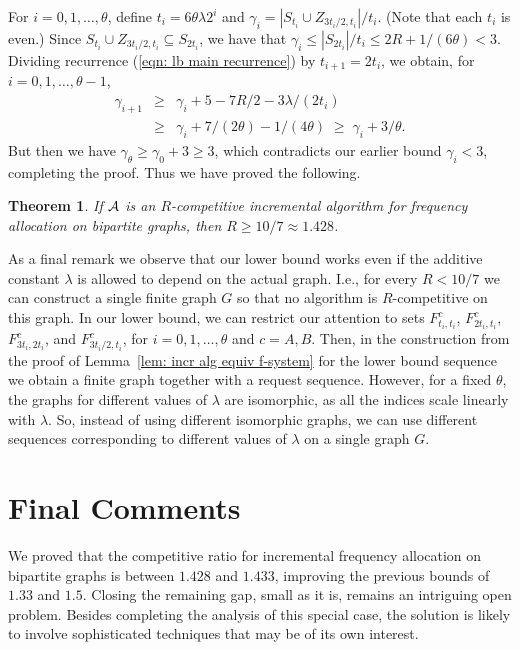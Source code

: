 \documentclass[11pt]{article}
\newcommand{\calA}{{\cal A}}
\newtheorem{theorem}{Theorem}[section]
\begin{document}
For $i = 0,1,\ldots,\theta$, define $t_i = 6\theta\lambda 2^i$ and
$\gamma_i = |S_{t_i} \cup Z_{3t_i/2,t_i}|/t_i$. (Note that each
$t_i$ is even.)
Since $S_{t_i} \cup Z_{3t_i/2,t_i} \subseteq S_{2t_i}$, we have
that $\gamma_i \le |S_{2t_i}|/t_i \le 2R +1/(6\theta) < 3$.
Dividing recurrence (\ref{eqn: lb main recurrence}) by $t_{i+1} = 2t_i$, 
we obtain, for $i = 0,1,\ldots,\theta-1$,
\begin{eqnarray*}
\gamma_{i+1} &\ge& \gamma_i + 5 - 7R/2 - 3\lambda/(2t_i) 
	\\
	&\ge& \gamma_i + 7/(2\theta) - 1/(4\theta)
	\;\ge\; \gamma_i + 3/\theta.
\end{eqnarray*}
But then we have $\gamma_\theta \ge \gamma_0 + 3 \ge 3$,
which contradicts our earlier bound $\gamma_i < 3$, completing
the proof. Thus we have proved the following.



\begin{theorem}\label{thm: 10/7 lower bound}
If $\calA$ is an $R$-competitive incremental algorithm for frequency
allocation on bipartite graphs, then $R\geq 10/7\approx 1.428$.
\end{theorem}

As a final remark we observe that our lower bound works even if the
additive constant $\lambda$ is allowed to depend on the actual
graph. I.e., for every $R<10/7$ we can construct a single finite graph
$G$ so that no algorithm is $R$-competitive on this graph.  In
 our lower bound, we can restrict our attention to sets
$F^c_{t_i,t_i}$, $F^c_{2t_i,t_i}$, $F^c_{3t_i,2t_i}$, and $F^c_{3t_i/2,t_i}$,
for $i = 0,1,\ldots,\theta$ and $c=A,B$.  Then, in the construction from
the proof of Lemma~\ref{lem: incr alg equiv f-system} for
the lower bound sequence we obtain a finite graph together with a
request sequence. However, for a fixed $\theta$, the
graphs for different values of $\lambda$ are isomorphic, as all the
indices scale linearly with $\lambda$. So, instead of using different
isomorphic graphs, we can use different sequences corresponding to
different values of $\lambda$ on a single graph $G$.



\section{Final Comments}

We proved that the competitive ratio for incremental frequency
allocation on bipartite graphs is between $1.428$ and $1.433$,
improving the previous bounds of $1.33$ and $1.5$. Closing the
remaining gap, small as it is, remains an intriguing open problem. 
Besides completing the analysis of this special case, the
solution is likely to involve sophisticated techniques that may be of 
its own interest.
\end{document}
